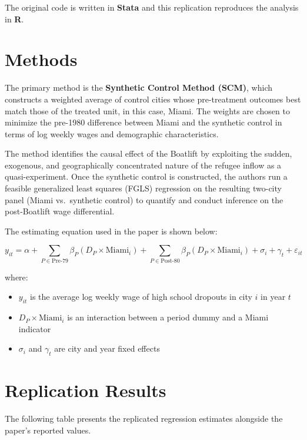 \documentclass[12pt]{article}
\begin{document}
The original code is written in \textbf{Stata} and this replication reproduces
the analysis in \textbf{R}.

\section{Methods}

The primary method is the \textbf{Synthetic Control Method (SCM)}, which constructs
a weighted average of control cities whose pre-treatment outcomes best match those
of the treated unit, in this case, Miami. The weights are chosen to minimize the
pre-1980 difference between Miami and the synthetic control in terms of log weekly
wages and demographic characteristics.

The method identifies the causal effect of the Boatlift by exploiting the
sudden, exogenous, and geographically concentrated nature of the refugee
inflow as a quasi-experiment. Once the synthetic control is constructed,
the authors run a feasible generalized least squares (FGLS) regression on
the resulting two-city panel (Miami vs.\ synthetic control) to quantify
and conduct inference on the post-Boatlift wage differential.

The estimating equation used in the paper is shown below:

\begin{equation}
y_{it} = \alpha + \sum_{P \in \text{Pre-79}} \beta_P (D_P \times \text{Miami}_i)
+ \sum_{P \in \text{Post-80}} \beta_P (D_P \times \text{Miami}_i)
+ \sigma_i + \gamma_t + \varepsilon_{it}
\end{equation}

where:
\begin{itemize}
    \item $y_{it}$ is the average log weekly wage of high school dropouts
    in city $i$ in year $t$
    \item $D_P \times \text{Miami}_i$ is an interaction between a period
    dummy and a Miami indicator
    \item $\sigma_i$ and $\gamma_t$ are city and year fixed effects
\end{itemize}

\section{Replication Results}

The following table presents the replicated regression estimates alongside
the paper's reported values.
\end{document}
